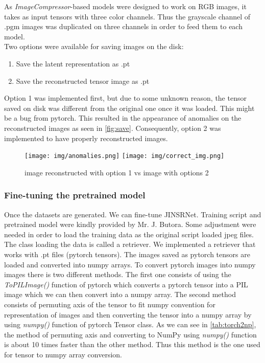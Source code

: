 \documentclass[12pt]{article}
\begin{document}
As \textit{ImageCompressor}-based models were designed to work on RGB images, it takes as input tensors with three color channels. Thus the grayscale channel of .pgm images was duplicated on three channels \autocite{butoraStatisticalModelsImage2017} in order to feed them to each model.\\
Two options were available for saving images on the disk:
\begin{enumerate}
    \item Save the latent representation as .pt
    \item Save the reconstructed tensor image as .pt
\end{enumerate}
Option 1 was implemented first, but due to some unknown reason, the tensor saved on disk was different from the original one once it was loaded. This might be a bug from pytorch. This resulted in the appearance of anomalies on the reconstructed images as seen in \autoref{fig:save}. Consequently, option 2 was implemented to have properly reconstructed images.
\begin{figure}[H]
    \texttt{[image: img/anomalies.png]}
    \texttt{[image: img/correct\_img.png]}
    \caption[Image reconstructed from tensor saved on disk]{image reconstructed with option 1 vs image with options 2}
    \label{fig:save}
\end{figure}

\subsubsection{Fine-tuning the pretrained model}
Once the datasets are generated. We can fine-tune JINSRNet.
Training script and pretrained model were kindly provided by Mr. J. Butora. Some adjustment were needed in order to load the training data as the original script loaded jpeg files. The class loading the data is called a retriever. We implemented a retriever that works with .pt files (pytorch tensors). The images saved as pytorch tensors are loaded and converted into numpy arrays. To convert pytorch images into numpy images there is two different methods. The first one consists of using the \textit{ToPILImage()} function of pytorch which converts a pytorch tensor into a PIL image which we can then convert into a numpy array. The second method consists of permuting axis of the tensor to fit numpy convention for representation of images and then converting the tensor into a numpy array by using \textit{numpy()} function of pytorch Tensor class. As we can see in \autoref{tab:torch2np}, the method of permuting axis and converting to NumPy using \textit{numpy()} function is about 10 times faster than the other method. Thus this method is the one used for tensor to numpy array conversion.\\
\end{document}
